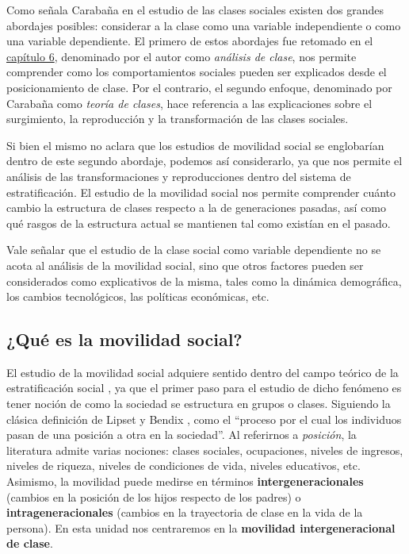 \documentclass[
]{book}
\begin{document}
Como señala Carabaña \citeyearpar{Carabana1997} en el estudio de las clases sociales existen dos grandes abordajes posibles: considerar a la clase como una variable independiente o como una variable dependiente. El primero de estos abordajes fue retomado en el \protect\hyperlink{independiente}{capítulo 6}, denominado por el autor como \emph{análisis de clase}, nos permite comprender como los comportamientos sociales pueden ser explicados desde el posicionamiento de clase. Por el contrario, el segundo enfoque, denominado por Carabaña como \emph{teoría de clases}, hace referencia a las explicaciones sobre el surgimiento, la reproducción y la transformación de las clases sociales.

Si bien el mismo no aclara que los estudios de movilidad social se englobarían dentro de este segundo abordaje, podemos así considerarlo, ya que nos permite el análisis de las transformaciones y reproducciones dentro del sistema de estratificación. El estudio de la movilidad social nos permite comprender cuánto cambio la estructura de clases respecto a la de generaciones pasadas, así como qué rasgos de la estructura actual se mantienen tal como existían en el pasado.

Vale señalar que el estudio de la clase social como variable dependiente no se acota al análisis de la movilidad social, sino que otros factores pueden ser considerados como explicativos de la misma, tales como la dinámica demográfica, los cambios tecnológicos, las políticas económicas, etc.

\hypertarget{quuxe9-es-la-movilidad-social}{%
\subsection{¿Qué es la movilidad social?}\label{quuxe9-es-la-movilidad-social}}

El estudio de la movilidad social adquiere sentido dentro del campo teórico de la estratificación social \citep{Cortes.Solis2006}, ya que el primer paso para el estudio de dicho fenómeno es tener noción de como la sociedad se estructura en grupos o clases. Siguiendo la clásica definición de Lipset y Bendix \citeyearpar[pp.~18]{Lipset.Bendix1963}, como el ``proceso por el cual los individuos pasan de una posición a otra en la sociedad''. Al referirnos a \emph{posición}, la literatura admite varias nociones: clases sociales, ocupaciones, niveles de ingresos, niveles de riqueza, niveles de condiciones de vida, niveles educativos, etc. Asimismo, la movilidad puede medirse en términos \textbf{intergeneracionales} (cambios en la posición de los hijos respecto de los padres) o \textbf{intrageneracionales} (cambios en la trayectoria de clase en la vida de la persona). En esta unidad nos centraremos en la \textbf{movilidad intergeneracional de clase}.
\end{document}
